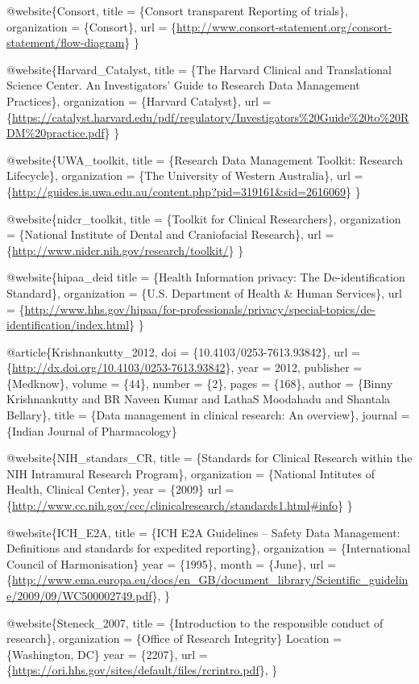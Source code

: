 \documentclass[]{book}
\theoremstyle{definition}
\theoremstyle{definition}
\theoremstyle{definition}
\theoremstyle{remark}
\begin{document}
@website\{Consort, title = \{Consort transparent Reporting of trials\},
organization = \{Consort\}, url =
\{\url{http://www.consort-statement.org/consort-statement/flow-diagram}\}
\}

@website\{Harvard\_Catalyst, title = \{The Harvard Clinical and
Translational Science Center. An Investigators' Guide to Research Data
Management Practices\}, organization = \{Harvard Catalyst\}, url =
\{\url{https://catalyst.harvard.edu/pdf/regulatory/Investigators\%20Guide\%20to\%20RDM\%20practice.pdf}\}
\}

@website\{UWA\_toolkit, title = \{Research Data Management Toolkit:
Research Lifecycle\}, organization = \{The University of Western
Australia\}, url =
\{\url{http://guides.is.uwa.edu.au/content.php?pid=319161\&sid=2616069}\}
\}

@website\{nidcr\_toolkit, title = \{Toolkit for Clinical Researchers\},
organization = \{National Institute of Dental and Craniofacial
Research\}, url = \{\url{http://www.nidcr.nih.gov/research/toolkit/}\}
\}

@website\{hipaa\_deid title = \{Health Information privacy: The
De-identification Standard\}, organization = \{U.S. Department of Health
\& Human Services\}, url =
\{\url{http://www.hhs.gov/hipaa/for-professionals/privacy/special-topics/de-identification/index.html}\}
\}

@article\{Krishnankutty\_2012, doi = \{10.4103/0253-7613.93842\}, url =
\{\url{http://dx.doi.org/10.4103/0253-7613.93842}\}, year = 2012,
publisher = \{Medknow\}, volume = \{44\}, number = \{2\}, pages =
\{168\}, author = \{Binny Krishnankutty and BR Naveen Kumar and LathaS
Moodahadu and Shantala Bellary\}, title = \{Data management in clinical
research: An overview\}, journal = \{Indian Journal of Pharmacology\}

@website\{NIH\_standars\_CR, title = \{Standards for Clinical Research
within the NIH Intramural Research Program\}, organization = \{National
Intitutes of Health, Clinical Center\}, year = \{2009\} url =
\{\url{http://www.cc.nih.gov/ccc/clinicalresearch/standards1.html\#info}\}
\}

@website\{ICH\_E2A, title = \{ICH E2A Guidelines -- Safety Data
Management: Definitions and standards for expedited reporting\},
organization = \{International Council of Harmonisation\} year =
\{1995\}, month = \{June\}, url =
\{\url{http://www.ema.europa.eu/docs/en_GB/document_library/Scientific_guideline/2009/09/WC500002749.pdf}\},
\}

@website\{Steneck\_2007, title = \{Introduction to the responsible
conduct of research\}, organization = \{Office of Research Integrity\}
Location = \{Washington, DC\} year = \{2207\}, url =
\{\url{https://ori.hhs.gov/sites/default/files/rcrintro.pdf}\}, \}
\end{document}
